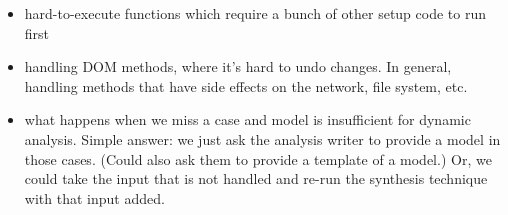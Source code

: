 \documentclass[]{article}
\begin{document}
\begin{itemize}
  \item hard-to-execute functions which require a bunch of other setup code to
  run first
  \item handling DOM methods, where it's hard to undo changes.  In general,
  handling methods that have side effects on the network, file system, etc.
  \item what happens when we miss a case and model is insufficient for dynamic
  analysis.  Simple answer: we just ask the analysis writer to provide a model in
  those cases.  (Could also ask them to provide a template of a model.)  Or, we
  could take the input that is not handled and re-run the synthesis technique with
  that input added.
\end{itemize}











% 
% 
\end{document}

